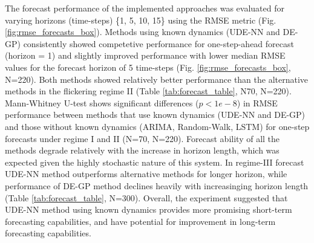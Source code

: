 \documentclass[openacc]{rsproca_new}%
\begin{document}
% 
The forecast performance of the implemented approaches was evaluated for varying horizons (time-steps) \{1, 5, 10, 15\} using the RMSE metric (Fig. \ref{fig:rmse_forecasts_box}). 
Methods using known dynamics (UDE-NN and DE-GP) consistently showed competetive performance for one-step-ahead forecast (horizon = 1) and slightly improved performance with lower median RMSE values for the forecast horizon of 5 time-steps (Fig. \ref{fig:rmse_forecasts_box}, N=220). Both methods showed relatively better performance than the alternative methods in the flickering regime II (Table \ref{tab:forecast_table}, N70, N=220).
Mann-Whitney U-test shows significant differences ($p<1e-8$) in RMSE performance between methods that use known dynamics (UDE-NN and DE-GP) and those without known dynamics (ARIMA, Random-Walk, LSTM) for one-step forecasts under regime I and II (N=70, N=220).
Forecast ability of all the methods degrade relatively with the increase in horizon length, which was expected given the highly stochastic nature of this system.
% 
In regime-III forecast UDE-NN method outperforms alternative methods for longer horizon, while performance of DE-GP method declines heavily with increasinging horizon length (Table \ref{tab:forecast_table}, N=300). Overall, the experiment suggested that UDE-NN method using known dynamics provides more promising short-term forecasting capabilities, and have potential for improvement in long-term forecasting capabilities.
%  
% 

\end{document}
